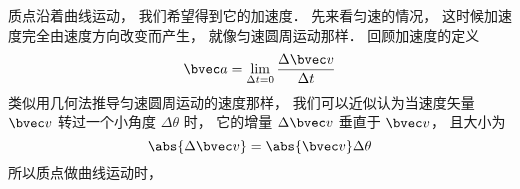 

质点沿着曲线运动， 我们希望得到它的加速度． 先来看匀速的情况， 这时候加速度完全由速度方向改变而产生， 就像匀速圆周运动那样． 回顾加速度的定义
\begin{equation}
\bvec a = \lim_{\Delta t = 0} \frac{\Delta \bvec v}{\Delta t}
\end{equation}
类似用几何法推导匀速圆周运动的速度那样， 我们可以近似认为当速度矢量 $\bvec v$ 转过一个小角度 $\Delta \theta$ 时， 它的增量 $\Delta \bvec v$ 垂直于 $\bvec v$， 且大小为
\begin{equation}
\abs{\Delta \bvec v} = \abs{\bvec v}\Delta\theta
\end{equation}
所以质点做曲线运动时， 
